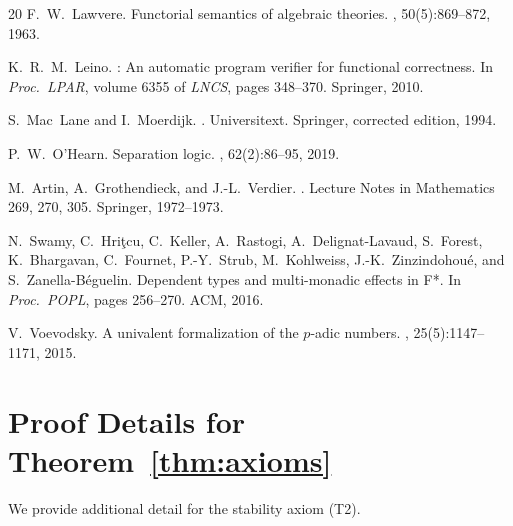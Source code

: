 \documentclass[11pt]{article}
\begin{document}
\begin{thebibliography}{20}
F.~W.~Lawvere.
\newblock Functorial semantics of algebraic theories.
,
  50(5):869--872, 1963.

K.~R.~M.~Leino.
: An automatic program verifier for functional correctness.
\newblock In {\em Proc.\ LPAR}, volume 6355 of {\em LNCS}, pages 348--370.
  Springer, 2010.

S.~Mac~Lane and I.~Moerdijk.
.
\newblock Universitext. Springer, corrected edition, 1994.

P.~W.~O'Hearn.
\newblock Separation logic.
, 62(2):86--95, 2019.

M.~Artin, A.~Grothendieck, and J.-L.~Verdier.
.
\newblock Lecture Notes in Mathematics 269, 270, 305. Springer, 1972--1973.

N.~Swamy, C.~Hri\c{t}cu, C.~Keller, A.~Rastogi, A.~Delignat-Lavaud,
  S.~Forest, K.~Bhargavan, C.~Fournet, P.-Y.~Strub, M.~Kohlweiss,
  J.-K.~Zinzindohou\'e, and S.~Zanella-B\'eguelin.
\newblock Dependent types and multi-monadic effects in {F*}.
\newblock In {\em Proc.\ POPL}, pages 256--270. ACM, 2016.

V.~Voevodsky.
\newblock A univalent formalization of the $p$-adic numbers.
, 25(5):1147--1171,
  2015.

\end{thebibliography}
\endgroup

\appendix

\section{Proof Details for Theorem~\ref{thm:axioms}}\label{app:axioms}

We provide additional detail for the stability axiom (T2).
\end{document}
